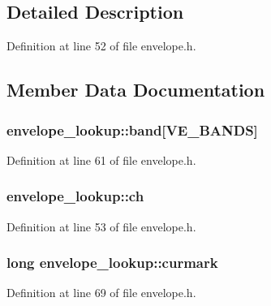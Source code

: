 \subsection{Detailed Description}


Definition at line 52 of file envelope.\+h.



\subsection{Member Data Documentation}
\subsubsection[{\texorpdfstring{band}{band}}]{ envelope\+\_\+lookup\+::band\mbox{[}{\bf V\+E\+\_\+\+B\+A\+N\+DS}\mbox{]}}\hypertarget{structenvelope__lookup_af041a323f12911941c4fe57e3ec034e2}{}\label{structenvelope__lookup_af041a323f12911941c4fe57e3ec034e2}


Definition at line 61 of file envelope.\+h.

\subsubsection[{\texorpdfstring{ch}{ch}}]{ envelope\+\_\+lookup\+::ch}\hypertarget{structenvelope__lookup_a5b6a11f7a3824c5c96d06319ef9a9b26}{}\label{structenvelope__lookup_a5b6a11f7a3824c5c96d06319ef9a9b26}


Definition at line 53 of file envelope.\+h.

\subsubsection[{\texorpdfstring{curmark}{curmark}}]{\setlength{\rightskip}{0pt plus 5cm}long envelope\+\_\+lookup\+::curmark}\hypertarget{structenvelope__lookup_a9fb4f0c6d5414f1de4a272dd9cb06de0}{}\label{structenvelope__lookup_a9fb4f0c6d5414f1de4a272dd9cb06de0}


Definition at line 69 of file envelope.\+h.

